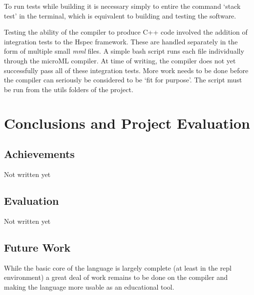 \documentclass[12pt, a4paper]{report}
\begin{document}
To run tests while building it is necessary simply to entire the command `stack test' in the
terminal, which is equivalent to building and testing the software.

Testing the ability of the compiler to produce C++ code involved the addition of integration tests
to the Hspec framework. These are handled separately in the form of multiple small \textit{mml}
files. A simple bash script runs each file individually through the microML compiler. At time of
writing, the compiler does not yet successfully pass all of these integration tests. More work needs
to be done before the compiler can seriously be considered to be `fit for purpose'. The script must
be run from the utils folders of the project.

\chapter{Conclusions and Project Evaluation}

\section{Achievements}
Not written yet

\section{Evaluation}
Not written yet

\section{Future Work}
While the basic core of the language is largely complete (at least in the repl environment) a great
deal of work remains to be done on the compiler and making the language more usable as an educational
tool.
\end{document}

